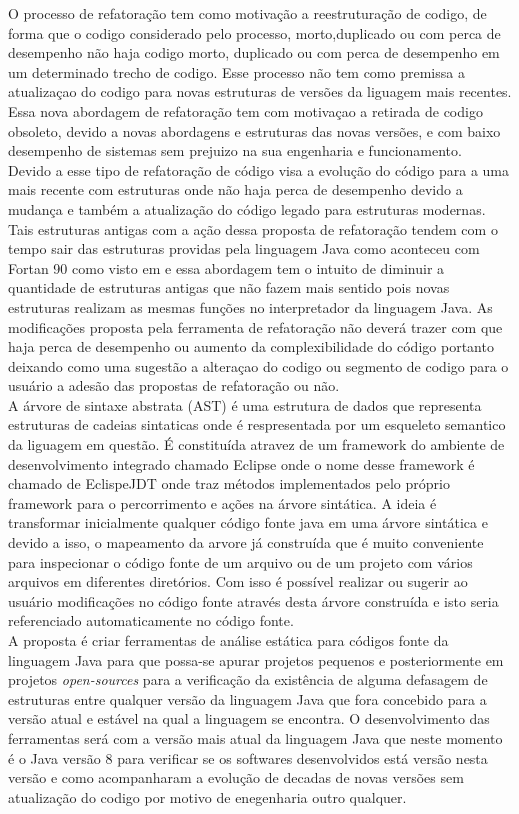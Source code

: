 O processo de refatoração tem como motivação a reestruturação de codigo, de forma que o codigo considerado pelo processo, morto,duplicado ou com perca de desempenho não haja codigo morto, duplicado ou com perca de desempenho em um determinado trecho de codigo. Esse processo não tem como premissa a atualizaçao do codigo para novas estruturas de versões da liguagem mais recentes. Essa nova abordagem de refatoração tem com motivaçao a retirada de codigo obsoleto, devido a novas abordagens e estruturas das novas versões, e com baixo desempenho de sistemas sem prejuizo na sua engenharia e funcionamento.\\

Devido a esse tipo de refatoração de código visa a evolução do código para a uma mais recente com estruturas onde não haja perca de desempenho devido a mudança e também a atualização do código legado para estruturas modernas. Tais estruturas antigas com a ação dessa proposta de refatoração tendem com o tempo sair das estruturas providas pela linguagem Java como aconteceu com Fortan 90 como visto em \cite{Jeffrey_Ralph} e essa abordagem tem o intuito de diminuir a quantidade de estruturas antigas que não fazem mais sentido pois novas estruturas realizam as mesmas funções no interpretador da linguagem Java. As modificações proposta pela ferramenta de refatoração não deverá trazer com que haja perca de desempenho ou aumento da complexibilidade do código portanto deixando como uma sugestão a alteraçao do codigo ou segmento de codigo para o usuário a adesão das propostas de refatoração ou não.\\

A árvore de sintaxe abstrata (AST) é uma estrutura de dados que representa estruturas de cadeias sintaticas onde é respresentada por um esqueleto semantico da liguagem em questão. É constituída atravez de um framework do ambiente de desenvolvimento integrado chamado Eclipse onde o nome desse framework é chamado de EclispeJDT onde traz métodos implementados pelo próprio framework para o percorrimento e ações na árvore sintática. A ideia é transformar inicialmente qualquer código fonte java em uma árvore sintática e devido a isso, o mapeamento da arvore já construída que é muito conveniente para inspecionar o código fonte de um arquivo ou de um projeto com vários arquivos em diferentes diretórios. Com isso é possível realizar ou sugerir ao usuário modificações no código fonte através desta árvore construída e isto seria referenciado automaticamente no código fonte.\\

A proposta é criar ferramentas de análise estática para códigos fonte da linguagem Java para que possa-se apurar projetos pequenos e posteriormente em projetos {\it open-sources} para a verificação da existência de alguma defasagem de estruturas entre qualquer versão da linguagem Java que fora concebido para a versão atual e estável na qual a linguagem se encontra. O desenvolvimento das ferramentas será com a versão mais atual da linguagem Java que neste momento é o Java versão 8 para verificar se os softwares desenvolvidos está versão nesta versão e como acompanharam a evolução de decadas de novas versões sem atualização do codigo por motivo de enegenharia outro qualquer.\\